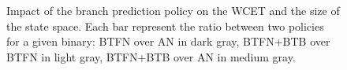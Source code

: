   
  \begin{figure}[h!]
    \centering
    \qquad\qquad       
    \caption{Impact of the branch prediction policy on the WCET and the size of the state space. Each bar represent the ratio between two policies for a given binary: BTFN over AN in dark gray, BTFN+BTB over BTFN in light gray, BTFN+BTB over AN in medium gray.
    }
    \label{fig:ratios}
  \end{figure}
  
